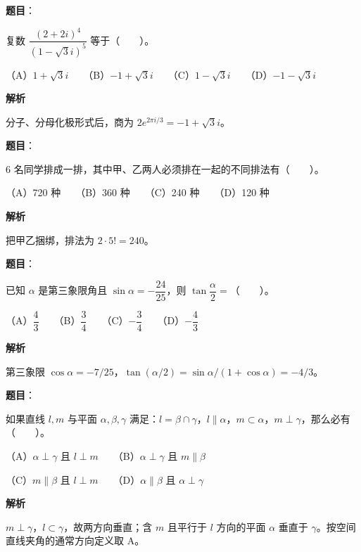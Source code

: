 \begin{answer}

\textbf{题目}：

复数 $\dfrac{(2+2i)^4}{(1-\sqrt{3}i)^5}$ 等于\mbox{（　　）}。

（A）$1+\sqrt{3}i$　　（B）$-1+\sqrt{3}i$　　（C）$1-\sqrt{3}i$　　（D）$-1-\sqrt{3}i$

\textbf{解析}

分子、分母化极形式后，商为 $2e^{2\pi i/3}=-1+\sqrt3i$。


\end{answer}
\begin{answer}

\textbf{题目}：

6 名同学排成一排，其中甲、乙两人必须排在一起的不同排法有\mbox{（　　）}。

（A）720 种　　（B）360 种　　（C）240 种　　（D）120 种

\textbf{解析}

把甲乙捆绑，排法为 $2\cdot5!=240$。


\end{answer}
\begin{answer}

\textbf{题目}：

已知 $\alpha$ 是第三象限角且 $\sin\alpha=-\dfrac{24}{25}$，则 $\tan\dfrac{\alpha}{2}=$\mbox{（　　）}。

（A）$\dfrac{4}{3}$　　（B）$\dfrac{3}{4}$　　（C）$-\dfrac{3}{4}$　　（D）$-\dfrac{4}{3}$

\textbf{解析}

第三象限 $\cos\alpha=-7/25$，$\tan(\alpha/2)=\sin\alpha/(1+\cos\alpha)=-4/3$。


\end{answer}
\begin{answer}

\textbf{题目}：

如果直线 $l,m$ 与平面 $\alpha,\beta,\gamma$ 满足：$l=\beta\cap\gamma$，$l\parallel\alpha$，$m\subset\alpha$，$m\perp\gamma$，那么必有\mbox{（　　）}。

（A）$\alpha\perp\gamma$ 且 $l\perp m$　　（B）$\alpha\perp\gamma$ 且 $m\parallel\beta$

（C）$m\parallel\beta$ 且 $l\perp m$　　（D）$\alpha\parallel\beta$ 且 $\alpha\perp\gamma$

\textbf{解析}

$m\perp\gamma$，$l\subset\gamma$，故两方向垂直；含 $m$ 且平行于 $l$ 方向的平面 $\alpha$ 垂直于 $\gamma$。按空间直线夹角的通常方向定义取 A。


\end{answer}
